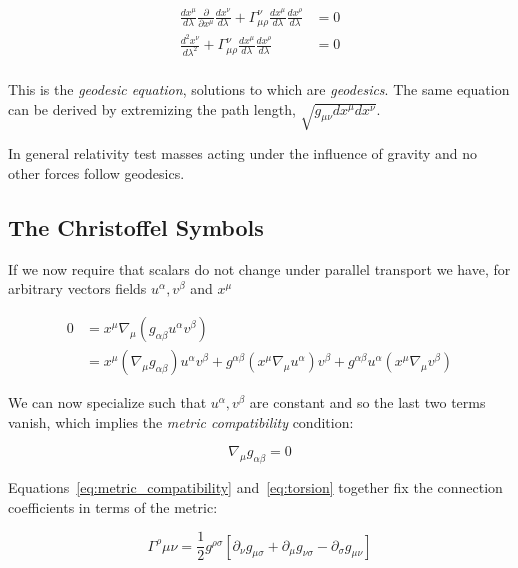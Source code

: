 \begin{align}
\label{eq:geodesic}
\frac{d x^\mu}{d\lambda}
  \frac{\partial }{\partial x^\mu}
  \frac{d x^\nu}{d\lambda}  
+ \Gamma^\nu_{\mu\rho} 
\frac{d x^\mu}{d\lambda}
\frac{d x^\rho}{d\lambda} &= 0 \nonumber \\
\frac{d^2 x^\nu}{d\lambda^2}
+ \Gamma^\nu_{\mu\rho} 
\frac{d x^\mu}{d\lambda}
\frac{d x^\rho}{d\lambda} &= 0 \nonumber \\
\end{align}

This is the \emph{geodesic equation}, solutions to which are
\emph{geodesics}.  The same equation can be derived by extremizing
the path length, $\sqrt{g_{\mu\nu} dx^\mu dx^\nu}$.

In general relativity test masses acting under the influence of
gravity and no other forces follow geodesics.  

\subsection{The Christoffel Symbols}

If we now require that scalars do not change under parallel transport
we have, for arbitrary vectors fields $u^\alpha, v^\beta$ and $x^\mu$

\begin{align*}
0 &= x^\mu \nabla_\mu (g_{\alpha\beta} u^\alpha v^\beta) \\
&= x^\mu (\nabla_\mu g_{\alpha\beta}) u^\alpha v^\beta
+ g^{\alpha\beta} (x^\mu \nabla_\mu u^\alpha) v^\beta
+ g^{\alpha\beta} u^\alpha (x^\mu \nabla_\mu v^\beta)
\end{align*}

We can now specialize such that $u^\alpha, v^\beta$ are constant
and so the last two terms vanish, which implies the  \emph{metric
compatibility} condition:

\begin{equation}
\label{eq:metric_compatibility}
\nabla_\mu g_{\alpha\beta} = 0
\end{equation}

Equations~\ref{eq:metric_compatibility} and~\ref{eq:torsion} together
fix the connection coefficients in terms of the metric:

\begin{equation}
\Gamma^{\rho}{\mu\nu}
= \frac{1}{2} g^{\rho\sigma}\left[
\partial_\nu g_{\mu\sigma}
+ \partial_\mu g_{\nu\sigma}
- \partial_\sigma g_{\mu\nu}
\right]
\end{equation}


